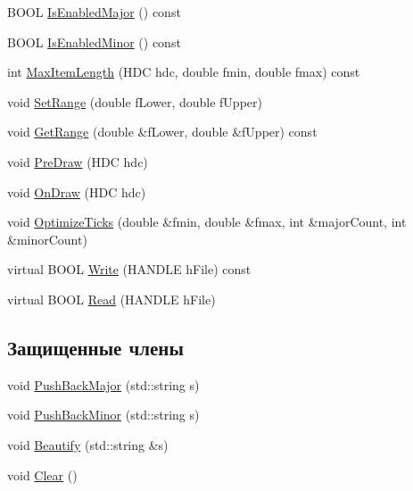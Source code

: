 \begin{DoxyCompactItemize}
\item 
B\-O\-O\-L \hyperlink{class_digits_a0f46d96f7792ffc099ddc4034bb8fe4a}{Is\-Enabled\-Major} () const 
\item 
B\-O\-O\-L \hyperlink{class_digits_af1060dd2a6333c9d1e36942ad5633546}{Is\-Enabled\-Minor} () const 
\item 
int \hyperlink{class_digits_a2a80cf9e4d366d03f4a0902af73af2bc}{Max\-Item\-Length} (H\-D\-C hdc, double fmin, double fmax) const 
\item 
void \hyperlink{class_digits_a8779eafb228a0b7ea0565ebd3198e71c}{Set\-Range} (double f\-Lower, double f\-Upper)
\item 
void \hyperlink{class_digits_ac3ec93b9ed68317ab11ef3a61b69934d}{Get\-Range} (double \&f\-Lower, double \&f\-Upper) const 
\item 
void \hyperlink{class_digits_a3957bbf3699a85811cbbaa01a93fcc88}{Pre\-Draw} (H\-D\-C hdc)
\item 
void \hyperlink{class_digits_ae652ae51841237c43ba06a7b7d5b9a89}{On\-Draw} (H\-D\-C hdc)
\item 
void \hyperlink{class_digits_a4a32dbae6da6819873e0fde7d963cc65}{Optimize\-Ticks} (double \&fmin, double \&fmax, int \&major\-Count, int \&minor\-Count)
\item 
virtual B\-O\-O\-L \hyperlink{class_digits_ad516fc5b9c052a5b0b82469e645a5d0a}{Write} (H\-A\-N\-D\-L\-E h\-File) const 
\item 
virtual B\-O\-O\-L \hyperlink{class_digits_a8e4038efd3b350b447a1d509eaa5040e}{Read} (H\-A\-N\-D\-L\-E h\-File)
\end{DoxyCompactItemize}
\subsection*{Защищенные члены}
\begin{DoxyCompactItemize}
\item 
void \hyperlink{class_digits_acfac4502fbb3122dbb0071af14b71d91}{Push\-Back\-Major} (std\-::string s)
\item 
void \hyperlink{class_digits_ac2f1179123ad83c98480e0ff8e55d12c}{Push\-Back\-Minor} (std\-::string s)
\item 
void \hyperlink{class_digits_ab946e7f29024bc8fda41c286d96958aa}{Beautify} (std\-::string \&s)
\item 
void \hyperlink{class_digits_ae401969abc8fd75f520a00512716a581}{Clear} ()
\end{DoxyCompactItemize}
